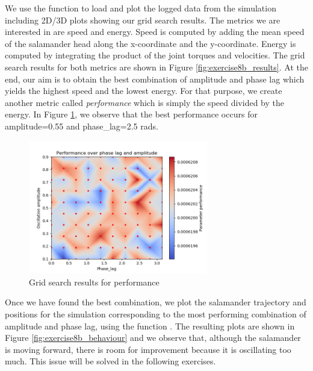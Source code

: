 \documentclass{cmc}
\begin{document}
 We use the function  to load and plot the logged data from the simulation including 2D/3D plots showing our grid search results. The metrics we are interested in are speed and energy. Speed is computed by adding the mean speed of the salamander head along the x-coordinate and the y-coordinate. Energy  is computed by integrating the product of the joint torques and velocities. The grid search results for both metrics are shown in Figure \ref{fig:exercise8b_results}. At the end, our aim is to obtain the best combination of amplitude and phase lag which yields the highest speed and the lowest energy. For that purpose, we create another metric called \textit{performance} which is simply the speed divided by the energy. In Figure \ref{fig:exercise8b_performance}, we observe that the best performance occurs for amplitude=0.55 and phase\_lag=2.5 rads.

\begin{figure}[H]
  \centering
  \includegraphics[width=0.7\textwidth]{figures/Performance.png}
  \caption{Grid search results for performance}
  \label{fig:exercise8b_performance}
\end{figure}

Once we have found the best combination, we plot the salamander trajectory and positions for the simulation corresponding to the most performing combination of amplitude and phase lag, using the function  . The resulting plots are shown in Figure \ref{fig:exercise8b_behaviour} and we observe that, although the salamander is moving forward, there is room for improvement because it is oscillating too much. This issue will be solved in the following exercises.
\end{document}
